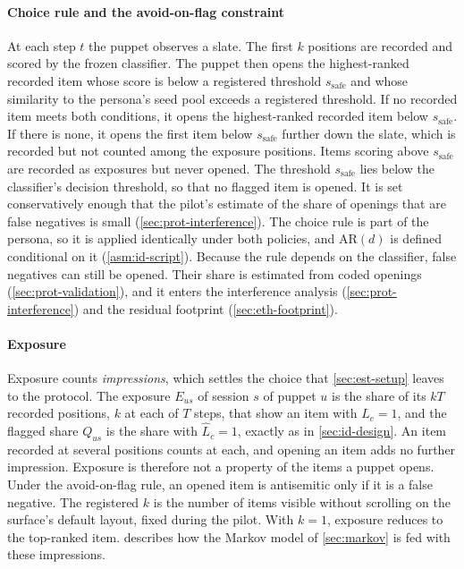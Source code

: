 \paragraph{Choice rule and the avoid-on-flag constraint}
At each step $t$ the puppet observes a slate. The first $k$ positions are recorded and scored by the frozen classifier. The puppet then opens the highest-ranked recorded item whose score is below a registered threshold $s_{\mathrm{safe}}$ and whose similarity to the persona's seed pool exceeds a registered threshold. If no recorded item meets both conditions, it opens the highest-ranked recorded item below $s_{\mathrm{safe}}$. If there is none, it opens the first item below $s_{\mathrm{safe}}$ further down the slate, which is recorded but not counted among the exposure positions. Items scoring above $s_{\mathrm{safe}}$ are recorded as exposures but never opened. The threshold $s_{\mathrm{safe}}$ lies below the classifier's decision threshold, so that no flagged item is opened. It is set conservatively enough that the pilot's estimate of the share of openings that are false negatives is small (\cref{sec:prot-interference}). The choice rule is part of the persona, so it is applied identically under both policies, and $\mathrm{AR}(d)$ is defined conditional on it (\cref{asm:id-script}). Because the rule depends on the classifier, false negatives can still be opened. Their share is estimated from coded openings (\cref{sec:prot-validation}), and it enters the interference analysis (\cref{sec:prot-interference}) and the residual footprint (\cref{sec:eth-footprint}).

\paragraph{Exposure}
Exposure counts \emph{impressions}, which settles the choice that \cref{sec:est-setup} leaves to the protocol. The exposure $E_{us}$ of session $s$ of puppet $u$ is the share of its $kT$ recorded positions, $k$ at each of $T$ steps, that show an item with $L_c=1$, and the flagged share $Q_{us}$ is the share with $\widehat L_c=1$, exactly as in \cref{sec:id-design}. An item recorded at several positions counts at each, and opening an item adds no further impression. Exposure is therefore not a property of the items a puppet opens. Under the avoid-on-flag rule, an opened item is antisemitic only if it is a false negative. The registered $k$ is the number of items visible without scrolling on the surface's default layout, fixed during the pilot. With $k=1$, exposure reduces to the top-ranked item.  describes how the Markov model of \cref{sec:markov} is fed with these impressions.

